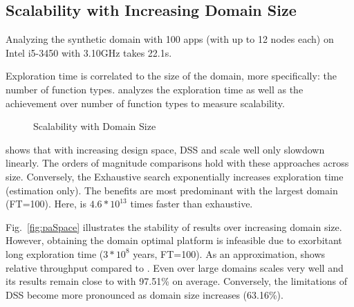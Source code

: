 \subsection{Scalability with Increasing Domain Size}
\label{sec:res:size}

 Analyzing the synthetic domain with 100 apps (with up to 12 nodes each) on Intel i5-3450 with 3.10GHz takes 22.1s.

Exploration time is correlated to the size of the domain, more specifically: the number of function types.  analyzes the exploration time as well as the achievement over number of function types to measure scalability. 

\begin{figure}[h]
	\centering
		\hfill
	\caption{Scalability with Domain Size}
	\label{fig:scale}
\end{figure}

 shows that with increasing design space, DSS and \ga scale well only slowdown linearly. The orders of magnitude comparisons hold with these approaches across size. Conversely, the Exhaustive search exponentially increases exploration time (estimation only). The benefits are most predominant with the largest domain (FT=100). Here, \gah is $4.6*10^{13}$ times faster than exhaustive.

Fig.~\ref{fig:paSpace} illustrates the stability of results over increasing domain size. However, obtaining the domain optimal platform is infeasible due to exorbitant long exploration time ($3*10^8$ years, FT=100). As an approximation,  shows relative throughput compared to \gaana. Even over large domains \gah scales very well and its results remain close to \gaana with 97.51\% on average. Conversely, the limitations of DSS become more pronounced as domain size increases (63.16\%).

